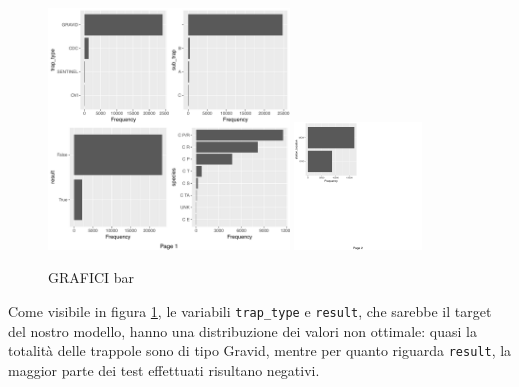 \begin{figure}[tb]
	\centering
	\includegraphics[width=0.57\textwidth]{images/ml/plot_bar1}
	\includegraphics[width=0.3\textwidth]{images/ml/plot_bar2}
	\caption{GRAFICI bar}
	\label{fig:plot_bar}
\end{figure}
Come visibile in figura \ref{fig:plot_bar}, le variabili \texttt{trap\_type} e 
\texttt{result}, che sarebbe il target del nostro modello, hanno una 
distribuzione dei valori non ottimale: quasi la totalità delle trappole sono di 
tipo Gravid, mentre per quanto riguarda \texttt{result}, la maggior parte dei 
test effettuati risultano negativi.
